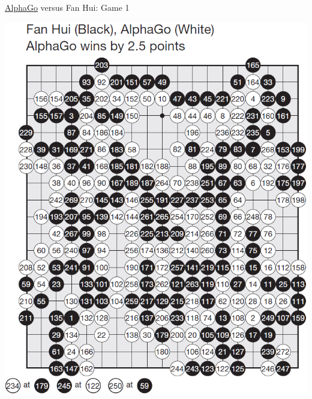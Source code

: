 \documentclass{beamer}
\begin{document}
{    \begin{frame}{{\color{white}\underline{AlphaGo}} versus {\color{black}Fan Hui}: Game 1}
      \begin{center}
        \includegraphics[height=.9\textheight]{../img/AlphaGo_vs_Fan_Hui_Game_1.png}
      \end{center}
    \end{frame}

}
\end{document}
